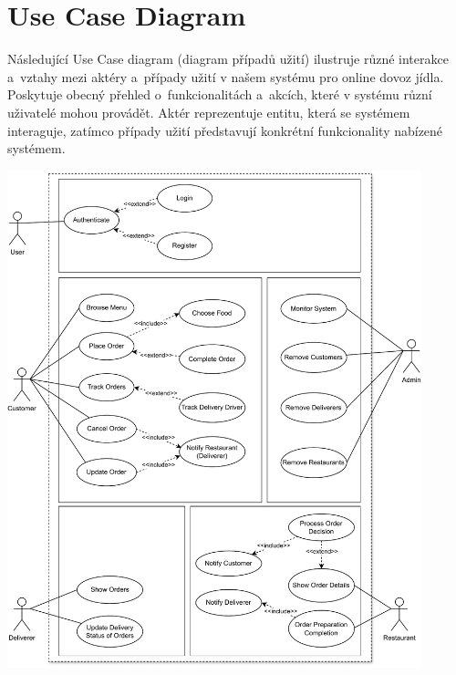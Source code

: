 \section{Use Case Diagram}

Následující Use Case diagram (diagram případů užití) ilustruje různé interakce a~vztahy mezi aktéry a~případy užití v našem systému pro online dovoz jídla. Poskytuje obecný přehled o~funkcionalitách a~akcích, které v systému různí uživatelé mohou provádět. Aktér reprezentuje entitu, která se systémem interaguje, zatímco případy užití představují konkrétní funkcionality nabízené systémem.

\begin{center}
	\includegraphics[width=0.9\textwidth]{assets/swi-uc-diagram-1.pdf}
\end{center}

\pagebreak
